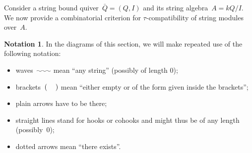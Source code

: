 \documentclass{amsart}
\theoremstyle{definition}
\newtheorem{notation}[theorem]{Notation}
\begin{document}
Consider a string bound quiver~$\bar Q = (Q,I)$ and its string algebra~${A = kQ/I}$.
We now provide a combinatorial criterion for $\tau$-compatibility of string modules over~$A$.

\begin{notation}
In the diagrams of this section, we will make repeated use of the following notation:
\begin{itemize}
 \item waves~$\xy \ar@{~} (0,0);(7,0) \endxy$ mean ``any string'' (possibly of length 0);
 \item brackets~$( \hspace{1pc} )$ mean ``either empty or of the form given inside the brackets'';
 \item plain arrows have to be there;
 \item straight lines stand for hooks or cohooks and might thus be of any length (possibly~$0$);
 \item dotted arrows mean ``there exists''.
\end{itemize}
\end{notation}
\end{document}

